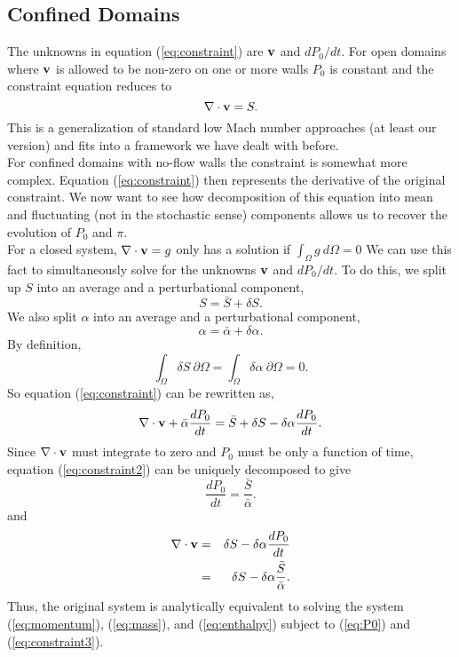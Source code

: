 \documentclass[final]{siamltex}
\def\vb {{\bf v}}
\begin{document}
\subsection{Confined Domains}
The unknowns in equation (\ref{eq:constraint}) are $\vb$ and $dP_0/d t$.
For open domains where $\vb$ is allowed to be non-zero on one or more walls $P_0$
is constant and the constraint equation reduces to
\begin{equation}
\nabla\cdot\vb = S.
\end{equation}
This is a generalization of standard low Mach number approaches (at least our version) 
and fits into
a framework we have dealt with before.\\

For confined domains with no-flow walls the constraint is somewhat more complex.
Equation (\ref{eq:constraint}) then represents the derivative of the original
constraint.  We now want to see how
decomposition of this equation into mean and fluctuating (not in the stochastic sense)
components allows us to recover the evolution of $P_0$ and $\pi$.\\

For a closed system, $\nabla \cdot \vb = g$ only has a solution if $\int_\Omega g~d\Omega = 0$
We can use this fact to simultaneously solve for the unknowns
$\vb$ and $dP_0/dt$.
To do this, we split up $S$ into an average and a perturbational component,
\begin{equation}
S = \bar{S} + \delta S.
\end{equation}
We also
split $\alpha$ into an average and a perturbational component,
\begin{equation}
\alpha = \bar{\alpha} + \delta\alpha.
\end{equation}
By definition,
\begin{equation}
\int_{\Omega} \delta S ~\partial\Omega = \int_{\Omega} \delta \alpha ~\partial\Omega = 0.\label{eq:zero int}
\end{equation}
So equation (\ref{eq:constraint}) can be rewritten as,
\begin{equation}
\nabla\cdot\vb + \bar{\alpha}\frac{dP_0}{d t} 
= \bar{S} + \delta S -
\delta\alpha\frac{dP_0}{d t}.\label{eq:constraint2}
\end{equation}
Since $\nabla \cdot \vb$ must integrate to zero and $P_0$ must be only a function of time,
equation (\ref{eq:constraint2}) can be uniquely decomposed to give
\begin{equation}
\frac{dP_0}{dt} = \frac{\bar{S}}{\bar{\alpha}}.\label{eq:P0}
\end{equation}
and
\begin{eqnarray}
\nabla\cdot\vb &=& \delta S - \delta\alpha\frac{dP_0}{dt} \nonumber\\
&=& \delta S - \delta\alpha\frac{\bar{S}}{\bar{\alpha}}.\label{eq:constraint3}
\end{eqnarray}
Thus, the original system is analytically equivalent to solving the system (\ref{eq:momentum}), (\ref{eq:mass}), and (\ref{eq:enthalpy})
subject to (\ref{eq:P0}) and (\ref{eq:constraint3}).
\end{document}
